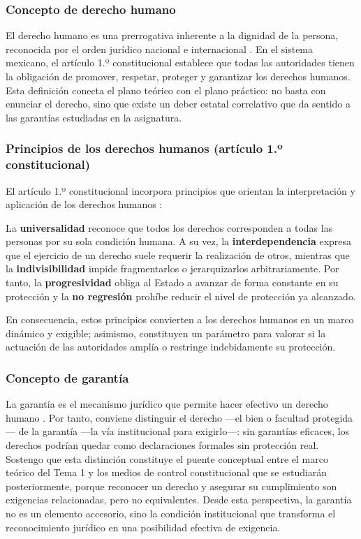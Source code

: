 ﻿\documentclass[
  spanish,
  letterpaper, oneside
]{article}
\begin{document}
\subsubsection{Concepto de derecho humano}

El derecho humano es una prerrogativa inherente a la dignidad de la persona, reconocida por el orden jurídico nacional e internacional \citep{alvarezIcazaDerechosMexico}. En el sistema mexicano, el artículo 1.º constitucional establece que todas las autoridades tienen la obligación de promover, respetar, proteger y garantizar los derechos humanos. Esta definición conecta el plano teórico con el plano práctico: no basta con enunciar el derecho, sino que existe un deber estatal correlativo que da sentido a las garantías estudiadas en la asignatura.

\subsubsection{Principios de los derechos humanos (artículo 1.º constitucional)}

El artículo 1.º constitucional incorpora principios que orientan la interpretación y aplicación de los derechos humanos \citep{alvarezIcazaDerechosMexico}:

La \textbf{universalidad} reconoce que todos los derechos corresponden a todas las personas por su sola condición humana. A su vez, la \textbf{interdependencia} expresa que el ejercicio de un derecho suele requerir la realización de otros, mientras que la \textbf{indivisibilidad} impide fragmentarlos o jerarquizarlos arbitrariamente. Por tanto, la \textbf{progresividad} obliga al Estado a avanzar de forma constante en su protección y la \textbf{no regresión} prohíbe reducir el nivel de protección ya alcanzado.

En consecuencia, estos principios convierten a los derechos humanos en un marco dinámico y exigible; asimismo, constituyen un parámetro para valorar si la actuación de las autoridades amplía o restringe indebidamente su protección.

\subsubsection{Concepto de garantía}

La garantía es el mecanismo jurídico que permite hacer efectivo un derecho humano \citep{marcanoSalazarDerechosHumanos}. Por tanto, conviene distinguir el derecho —el bien o facultad protegida— de la garantía —la vía institucional para exigirlo—: sin garantías eficaces, los derechos podrían quedar como declaraciones formales sin protección real. Sostengo que esta distinción constituye el puente conceptual entre el marco teórico del Tema 1 y los medios de control constitucional que se estudiarán posteriormente, porque reconocer un derecho y asegurar su cumplimiento son exigencias relacionadas, pero no equivalentes. Desde esta perspectiva, la garantía no es un elemento accesorio, sino la condición institucional que transforma el reconocimiento jurídico en una posibilidad efectiva de exigencia.
\end{document}
